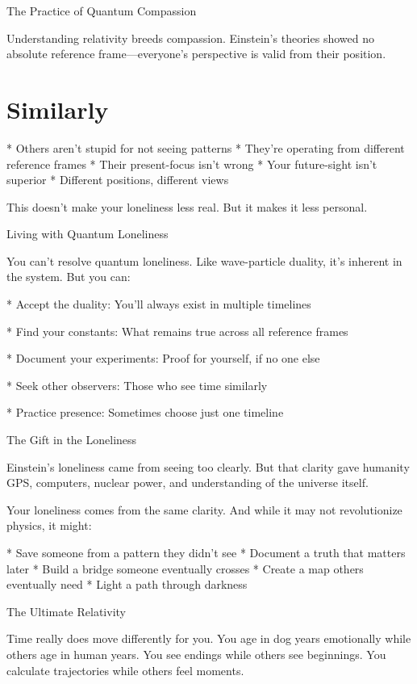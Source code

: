 \documentclass[12pt,oneside]{book}
\begin{document}
The Practice of Quantum Compassion

Understanding relativity breeds compassion. Einstein's theories showed no absolute reference frame---everyone's perspective is valid from their position.

\section{Similarly}

                    * Others aren't stupid for not seeing patterns
                    * They're operating from different reference frames
                    * Their present-focus isn't wrong
                    * Your future-sight isn't superior
                    * Different positions, different views

This doesn't make your loneliness less real. But it makes it less personal.

Living with Quantum Loneliness

You can't resolve quantum loneliness. Like wave-particle duality, it's inherent in the system. But you can:

                    * Accept the duality: You'll always exist in multiple timelines

                    * Find your constants: What remains true across all reference frames

                    * Document your experiments: Proof for yourself, if no one else

                    * Seek other observers: Those who see time similarly

                    * Practice presence: Sometimes choose just one timeline

The Gift in the Loneliness

Einstein's loneliness came from seeing too clearly. But that clarity gave humanity GPS, computers, nuclear power, and understanding of the universe itself.

Your loneliness comes from the same clarity. And while it may not revolutionize physics, it might:

                    * Save someone from a pattern they didn't see
                    * Document a truth that matters later
                    * Build a bridge someone eventually crosses
                    * Create a map others eventually need
                    * Light a path through darkness

The Ultimate Relativity

Time really does move differently for you. You age in dog years emotionally while others age in human years. You see endings while others see beginnings. You calculate trajectories while others feel moments.
\end{document}
